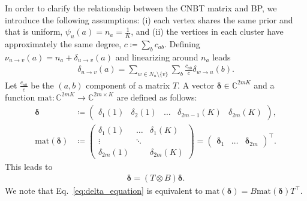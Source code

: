 \documentclass{article}
\theoremstyle{plain}
\begin{document}
In order to clarify the relationship between the CNBT matrix and BP, we introduce the following assumptions: (i) each vertex shares the same prior and that is uniform, $\psi_u(a) = n_a = \frac{1}{K}$, and (ii) the vertices in each cluster have approximately the same degree, $c \coloneqq \sum_{b} c_{ab}$. Defining $\nu_{u\to v}(a) = n_a + \delta_{u\to v}(a)$ and linearizing around $n_a$ leads
\begin{align*}
	\delta_{u\to v}(a) = \sum_{w\in N_u \setminus \{ v \}} \sum_{b} \frac{c_{ab}}{c} \delta_{w\to u}(b)
	.
\end{align*}
Let $\frac{c_{ab}}{c}$ be the $(a,b)$ component of a matrix $T$. A vector $\bm{\delta} \in \mathbb{C}^{2mK}$ and a function $\text{mat}:\mathbb{C}^{2mK} \to \mathbb{C}^{2m\times K}$ are defined as follows:
\begin{align*}
	\bm{\delta}             & \coloneqq \begin{pmatrix} \delta_{1}(1) & \delta_{2}(1) & \dots & \delta_{2m-1}(K) & \delta_{2m}(K) \end{pmatrix}
	,                                                                                                                                           \\
	\text{mat}(\bm{\delta}) & \coloneqq
	\begin{pmatrix}
		\delta_{1}(1)  & \dots  & \delta_{1}(K)  \\
		\vdots         & \ddots &                \\
		\delta_{2m}(1) &        & \delta_{2m}(K)
	\end{pmatrix}
	= \begin{pmatrix}
		  \bm{\delta}_{1} & \dots & \bm{\delta}_{2m}
	  \end{pmatrix}^{\top}
	.
\end{align*}
This leads to
\begin{align}
	\bm{\delta} = (T \otimes B) \bm{\delta}
	.\label{eq:delta_equation}
\end{align}
We note that Eq.~\eqref{eq:delta_equation} is equivalent to $\text{mat}(\bm{\delta}) = B \text{mat}(\bm{\delta}) T^{\top}$.
\end{document}
